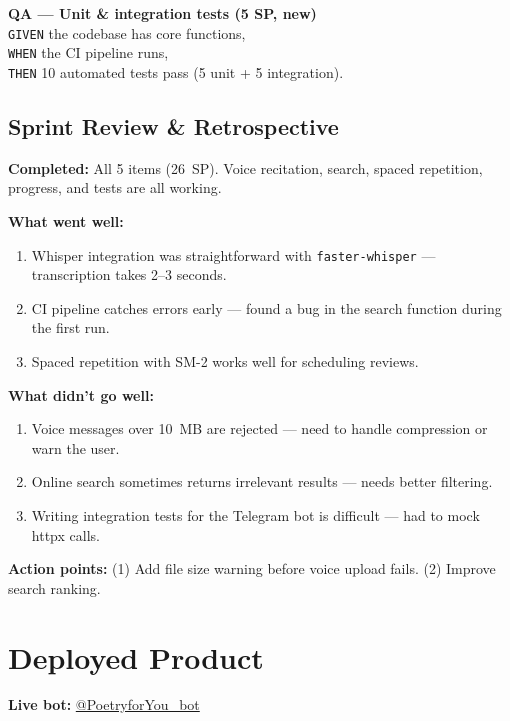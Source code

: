 \documentclass[11pt, a4paper]{article}
\begin{document}
\textbf{QA --- Unit \& integration tests (5 SP, new)}\\
\texttt{GIVEN} the codebase has core functions,\\
\texttt{WHEN} the CI pipeline runs,\\
\texttt{THEN} 10 automated tests pass (5 unit + 5 integration).

\subsection*{Sprint Review \& Retrospective}

\textbf{Completed:} All 5 items (26~SP). Voice recitation, search, spaced repetition, progress, and tests are all working.

\textbf{What went well:}
\begin{enumerate}
    \item Whisper integration was straightforward with \texttt{faster-whisper} --- transcription takes 2--3 seconds.
    \item CI pipeline catches errors early --- found a bug in the search function during the first run.
    \item Spaced repetition with SM-2 works well for scheduling reviews.
\end{enumerate}

\textbf{What didn't go well:}
\begin{enumerate}
    \item Voice messages over 10~MB are rejected --- need to handle compression or warn the user.
    \item Online search sometimes returns irrelevant results --- needs better filtering.
    \item Writing integration tests for the Telegram bot is difficult --- had to mock httpx calls.
\end{enumerate}

\textbf{Action points:} (1) Add file size warning before voice upload fails. (2) Improve search ranking.


\section{Deployed Product}

\textbf{Live bot:} \href{https://t.me/PoetryforYou_bot}{@PoetryforYou\_bot}
\end{document}
